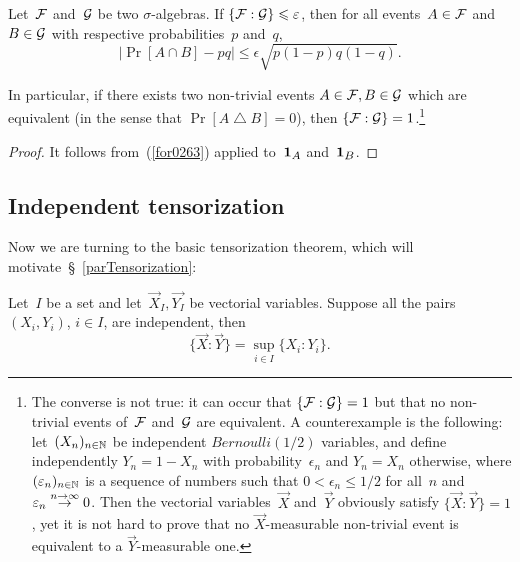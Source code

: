 \label{parpro0699}\begin{Pro}\label{pro0699}
Let~$\mathcal{F}$ and~$\mathcal{G}$ be two $\sigma$-algebras.
If $\{ \mathcal{F} : \mathcal{G} \} \leqslant \varepsilon$,
then for all events~$A\in\mathcal{F}$ and~$B\in\mathcal{G}$
with respective probabilities~$p$ and~$q$,
\[\label{for3346} \big| \Pr[A\cap B] - pq \big| \leq \epsilon \sqrt{p(1-p)q(1-q)} .\]

In particular, if there exists two non-trivial events $A\in\mathcal{F}, B\in\mathcal{G}$
which are equivalent (in the sense that $\Pr[A\bigtriangleup B] = 0$),
then $\{\mathcal{F}:\mathcal{G}\} = 1$.\footnote{%
The converse is not true: it can occur that $\{\mathcal{F}:\mathcal{G}\}=1$
but that no non-trivial events of~$\mathcal{F}$ and~$\mathcal{G}$ are equivalent.
A counterexample is the following: let~$(X_n)_{n\in\mathbb{N}}$
be independent $\mathit{Bernoulli}(1/2)$ variables, and define independently
$Y_n = 1-X_n$ with probability~$\epsilon_n$ and $Y_n = X_n$ otherwise,
where $(\varepsilon_n)_{n\in\mathbb{N}}$ is a sequence of numbers such that
$0 < \epsilon_n \leq 1/2$ for all~$n$
and $\varepsilon_n\stackrel{n\to\infty}{\to}0$.
Then the vectorial variables~$\vec{X}$ and~$\vec{Y}$ obviously satisfy $\{\vec{X}:\vec{Y}\} = 1$,
yet it is not hard to prove that no $\vec{X}$-measurable non-trivial event
is equivalent to a $\vec{Y}$-measurable one.}
\end{Pro}

\begin{proof}
It follows from~(\ref{for0263}) applied to~$\1{A}$ and~$\1{B}$.
\end{proof}


\subsection{Independent tensorization}\label{parIndependentTensorization}

Now we are turning to the basic tensorization theorem,
which will motivate~\S~\ref{parTensorization}:
%
\begin{Thm}\label{pro1252}
Let~$I$ be a set and let~$\vec{X}_I,\vec{Y_I}$ be vectorial variables.
Suppose all the pairs $(X_i,Y_i)$, $i\in I$, are independent, then
\[\label{for6560} \big\{ \vec{X} : \vec{Y} \big\} = \sup_{i\in I} \{ X_i : Y_i \} .\]
\end{Thm}

